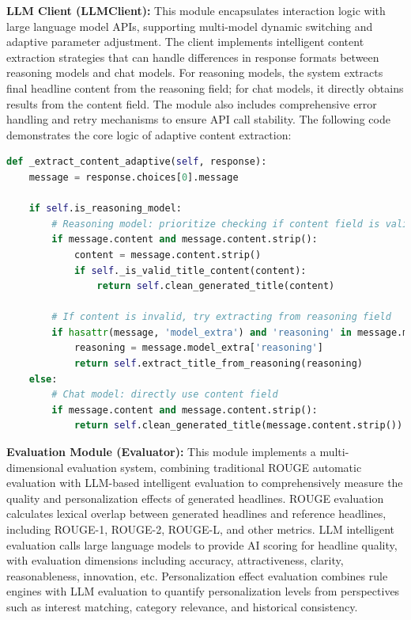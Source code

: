 \documentclass[10pt,a4paper]{article}
\begin{document}
\textbf{LLM Client (LLMClient):} This module encapsulates interaction logic with large language model APIs, supporting multi-model dynamic switching and adaptive parameter adjustment. The client implements intelligent content extraction strategies that can handle differences in response formats between reasoning models and chat models. For reasoning models, the system extracts final headline content from the reasoning field; for chat models, it directly obtains results from the content field. The module also includes comprehensive error handling and retry mechanisms to ensure API call stability. The following code demonstrates the core logic of adaptive content extraction:

\begin{lstlisting}[language=Python, caption=Adaptive Content Extraction]
def _extract_content_adaptive(self, response):
    message = response.choices[0].message
    
    if self.is_reasoning_model:
        # Reasoning model: prioritize checking if content field is valid
        if message.content and message.content.strip():
            content = message.content.strip()
            if self._is_valid_title_content(content):
                return self.clean_generated_title(content)
        
        # If content is invalid, try extracting from reasoning field
        if hasattr(message, 'model_extra') and 'reasoning' in message.model_extra:
            reasoning = message.model_extra['reasoning']
            return self.extract_title_from_reasoning(reasoning)
    else:
        # Chat model: directly use content field
        if message.content and message.content.strip():
            return self.clean_generated_title(message.content.strip())
\end{lstlisting}

\textbf{Evaluation Module (Evaluator):} This module implements a multi-dimensional evaluation system, combining traditional ROUGE automatic evaluation with LLM-based intelligent evaluation to comprehensively measure the quality and personalization effects of generated headlines. ROUGE evaluation calculates lexical overlap between generated headlines and reference headlines, including ROUGE-1, ROUGE-2, ROUGE-L, and other metrics. LLM intelligent evaluation calls large language models to provide AI scoring for headline quality, with evaluation dimensions including accuracy, attractiveness, clarity, reasonableness, innovation, etc. Personalization effect evaluation combines rule engines with LLM evaluation to quantify personalization levels from perspectives such as interest matching, category relevance, and historical consistency.
\end{document}
